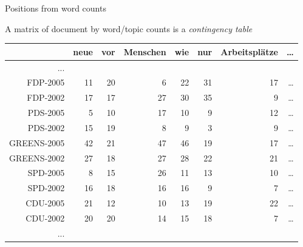 \documentclass{hertieteaching}
\begin{document}
\begin{frame}{Positions from word counts}

A matrix of document by word/topic counts is a \textit{contingency table}

\begin{center}{\scriptsize
\begin{tabular}{rrrrrrrr} \toprule
          & neue & vor &Menschen& wie &nur & Arbeitsplätze & \ldots \\ \midrule
...\\
FDP-2005  &    11 & 20  &      6 & 22  &31 &            17 & \ldots\\
FDP-2002  &    17 & 17  &     27 & 30  &35  &            9 & \ldots\\
PDS-2005  &     5 & 10  &     17 & 10  & 9   &          12& \ldots\\
PDS-2002  &    15 & 19  &      8  & 9  & 3    &          9& \ldots\\
GREENS-2005  & 42 & 21    &   47 & 46 & 19 &            17& \ldots\\
GREENS-2002  & 27 & 18    &   27 & 28  &22 &            21& \ldots\\
SPD-2005  &     8 & 15 &      26 & 11 & 13     &        10& \ldots\\
SPD-2002  &    16 & 18 &      16 & 16 &  9      &        7& \ldots\\
CDU-2005  &    21 & 12 &      10 & 13 & 19       &      22& \ldots\\
CDU-2002  &    20 & 20 &      14 & 15 & 18        &      7& \ldots\\ 
...\\
\bottomrule
\end{tabular}}
\end{center}

\end{frame}
\end{document}
